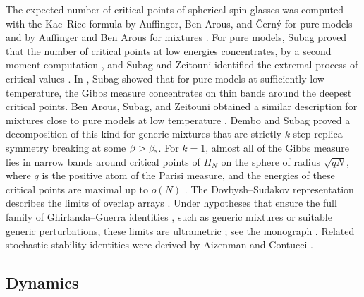 The expected number of critical points of spherical spin glasses was computed with the Kac--Rice formula by Auffinger, Ben Arous, and \v{C}ern\'y for pure models \cite{AuffingerBenArousCerny2013} and by Auffinger and Ben Arous for mixtures \cite{AuffingerBenArous2013}. For pure models, Subag proved that the number of critical points at low energies concentrates, by a second moment computation \cite{Subag2017complexity}, and Subag and Zeitouni identified the extremal process of critical values \cite{SubagZeitouni2017}. In \cite{Subag2017geometry}, Subag showed that for pure models at sufficiently low temperature, the Gibbs measure concentrates on thin bands around the deepest critical points. Ben Arous, Subag, and Zeitouni obtained a similar description for mixtures close to pure models at low temperature \cite{BenArousSubagZeitouni2020}. Dembo and Subag proved a decomposition of this kind for generic mixtures that are strictly $k$-step replica symmetry breaking at some $\beta>\beta_{\mathrm s}$. For $k=1$, almost all of the Gibbs measure lies in narrow bands around critical points of $H_N$ on the sphere of radius $\sqrt{qN}$, where $q$ is the positive atom of the Parisi measure, and the energies of these critical points are maximal up to $o(N)$ \cite[Proposition~3.1]{DemboSubag2026}. The Dovbysh--Sudakov representation describes the limits of overlap arrays \cite{DovbyshSudakov1982,Panchenko2010DS}. Under hypotheses that ensure the full family of Ghirlanda--Guerra identities \cite{GhirlandaGuerra1998,Panchenko2010GG}, such as generic mixtures or suitable generic perturbations, these limits are ultrametric \cite{Panchenko2013ultrametricity}; see the monograph \cite{Panchenko2013book}. Related stochastic stability identities were derived by Aizenman and Contucci \cite{AizenmanContucci1998}.

\subsection{Dynamics}\label{sec:intro-dynamics}

